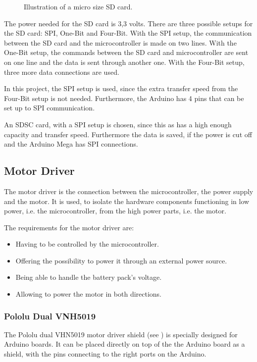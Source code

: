 \begin{minipage}{\linewidth}
\begin{minipage}{0.30\linewidth}
\begin{figure}[H]
              \caption{Illustration of a micro size SD card.\cite{elasticsheep}} 
              \label{SDcardpinout}
          \end{figure}\vspace{-5mm}
      \end{minipage}
      
  \end{minipage}


The power needed for the SD card is 3,3 volts\cite{elasticsheep}. There are three possible setups for the SD card: SPI, One-Bit and Four-Bit.
With the SPI setup, the communication between the SD card and the microcontroller is made on two lines. With the One-Bit setup, the commands between the SD card and microcontroller are sent on one line and the data is sent through another one.
With the Four-Bit setup, three more data connections are used.

In this project, the SPI setup is used, since the extra transfer speed from the Four-Bit setup is not needed. Furthermore, the Arduino has 4 pins that can be set up to SPI communication\cite{MegaInfo}.

An SDSC card, with a SPI setup is chosen, since this as has a high enough capacity and transfer speed. Furthermore the data is saved, if the power is cut off and the Arduino Mega has SPI connections. 



\subsection{Motor Driver}
The motor driver is the connection between the microcontroller, the power supply and the motor. It is used, to isolate the hardware components functioning in low power, i.e. the microcontroller, from the high power parts, i.e. the motor.

The requirements for the motor driver are:
\begin{itemize}
\item Having to be controlled by the microcontroller.
\item Offering the possibility to power it through an external power source.
\item Being able to handle the battery pack's voltage.
\item Allowing to power the motor in both directions.
\end{itemize}

\subsubsection{Pololu Dual VNH5019}
The Pololu dual VHN5019 motor driver shield (see ) is specially designed for Arduino boards. It can be placed directly on top of the the Arduino board as a shield, with the pins connecting to the right ports on the Arduino.\cite{PCorporation}

